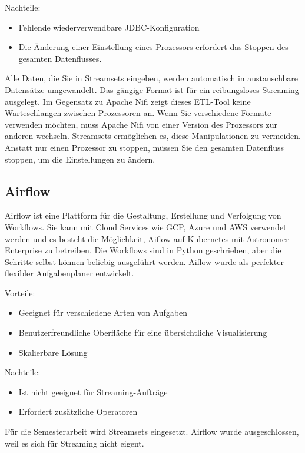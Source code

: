 Nachteile: 
\begin{itemize}
  \item Fehlende wiederverwendbare JDBC-Konfiguration 
  \item Die {\"A}nderung einer Einstellung eines Prozessors erfordert das Stoppen des gesamten Datenflusses.
\end{itemize}
 
Alle Daten, die Sie in Streamsets eingeben, werden automatisch in austauschbare Datens{\"a}tze umgewandelt. Das g{\"a}ngige Format ist f{\"u}r ein reibungsloses Streaming ausgelegt. Im Gegensatz zu Apache Nifi zeigt dieses ETL-Tool keine Warteschlangen zwischen Prozessoren an. Wenn Sie verschiedene Formate verwenden m{\"o}chten, muss Apache Nifi von einer Version des Prozessors zur anderen wechseln. Streamsets erm{\"o}glichen es, diese Manipulationen zu vermeiden. Anstatt nur einen Prozessor zu stoppen, m{\"u}ssen Sie den gesamten Datenfluss stoppen, um die Einstellungen zu {\"a}ndern. 

\subsection{Airflow}

Airflow ist eine Plattform f{\"u}r die Gestaltung, Erstellung und Verfolgung von Workflows. Sie kann mit Cloud Services wie GCP, Azure und AWS verwendet werden und es besteht die M{\"o}glichkeit, Aiflow auf Kubernetes mit Astronomer Enterprise zu betreiben. Die Workflows sind in Python geschrieben, aber die Schritte selbst k{\"o}nnen beliebig ausgef{\"u}hrt werden. Aiflow wurde als perfekter flexibler Aufgabenplaner entwickelt. 

Vorteile: 
\begin{itemize}
  \item Geeignet f{\"u}r verschiedene Arten von Aufgaben
  \item Benutzerfreundliche Oberfl{\"a}che f{\"u}r eine {\"u}bersichtliche Visualisierung
  \item Skalierbare L{\"o}sung
\end{itemize}

Nachteile: 
\begin{itemize}
  \item Ist nicht geeignet f{\"u}r Streaming-Auftr{\"a}ge 
  \item Erfordert zus{\"a}tzliche Operatoren
\end{itemize}

F{\"u}r die Semesterarbeit wird Streamsets eingesetzt. Airflow wurde ausgeschlossen, weil es sich f{\"u}r Streaming nicht eigent. 

